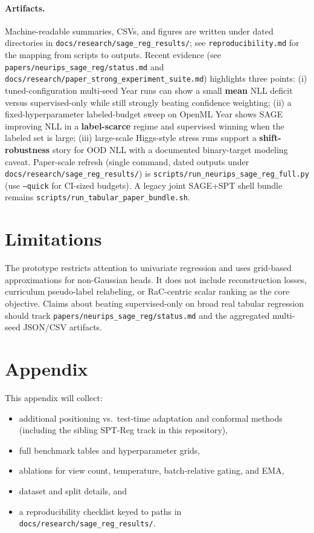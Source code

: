 \documentclass{article}
\begin{document}
\paragraph{Artifacts.}
Machine-readable summaries, CSVs, and figures are written under dated
directories in \texttt{docs/research/sage\_reg\_results/}; see
\texttt{reproducibility.md} for the mapping from scripts to outputs.
Recent evidence (see \texttt{papers/neurips\_sage\_reg/status.md} and
\texttt{docs/research/paper\_strong\_experiment\_suite.md}) highlights three
points: (i) tuned-configuration multi-seed Year runs can show a small
\textbf{mean} NLL deficit versus supervised-only while still strongly beating
confidence weighting; (ii) a fixed-hyperparameter labeled-budget sweep on OpenML
Year shows SAGE improving NLL in a \textbf{label-scarce} regime and supervised
winning when the labeled set is large; (iii) large-scale Higgs-style stress
runs support a \textbf{shift-robustness} story for OOD NLL with a documented
binary-target modeling caveat. Paper-scale refresh (single command, dated outputs under
\texttt{docs/research/sage\_reg\_results/}) is
\texttt{scripts/run\_neurips\_sage\_reg\_full.py} (use \texttt{--quick} for CI-sized
budgets). A legacy joint SAGE+SPT shell bundle remains
\texttt{scripts/run\_tabular\_paper\_bundle.sh}.

\section{Limitations}

The prototype restricts attention to univariate regression and uses grid-based
approximations for non-Gaussian heads. It does not include reconstruction
losses, curriculum pseudo-label relabeling, or RaC-centric scalar ranking as
the core objective. Claims about beating supervised-only on broad real tabular
regression should track \texttt{papers/neurips\_sage\_reg/status.md} and the
aggregated multi-seed JSON/CSV artifacts.




\appendix

\section{Appendix}

This appendix will collect:
\begin{itemize}
  \item additional positioning vs.\ test-time adaptation and conformal methods
  (including the sibling SPT-Reg track in this repository),
  \item full benchmark tables and hyperparameter grids,
  \item ablations for view count, temperature, batch-relative gating, and EMA,
  \item dataset and split details, and
  \item a reproducibility checklist keyed to paths in
  \texttt{docs/research/sage\_reg\_results/}.
\end{itemize}
\end{document}
